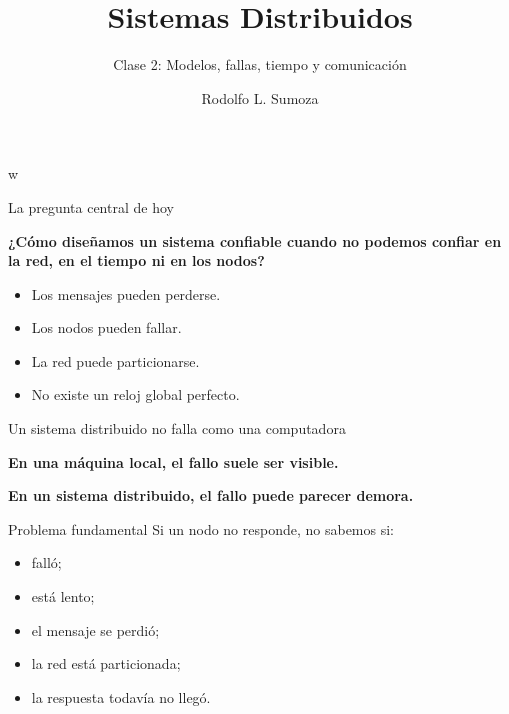 w\documentclass[aspectratio=169]{beamer}
\title{Sistemas Distribuidos}
\subtitle{Clase 2: Modelos, fallas, tiempo y comunicación}
\author{Rodolfo L. Sumoza}
\institute{Universidad Austral}
\date{}
\begin{document}
\begin{frame}
  \titlepage
\end{frame}

\begin{frame}{La pregunta central de hoy}

\Large

\begin{center}
\textbf{¿Cómo diseñamos un sistema confiable cuando no podemos confiar en la red, en el tiempo ni en los nodos?}
\end{center}

\vspace{1cm}

\normalsize

\begin{itemize}
    \item Los mensajes pueden perderse.
    \item Los nodos pueden fallar.
    \item La red puede particionarse.
    \item No existe un reloj global perfecto.
\end{itemize}

\end{frame}

\begin{frame}{Un sistema distribuido no falla como una computadora}

\Large

\begin{center}
\textbf{En una máquina local, el fallo suele ser visible.}
\end{center}

\vspace{0.5cm}

\begin{center}
\textbf{En un sistema distribuido, el fallo puede parecer demora.}
\end{center}

\vspace{0.8cm}

\normalsize

\begin{block}{Problema fundamental}
Si un nodo no responde, no sabemos si:
\end{block}

\begin{itemize}
    \item falló;
    \item está lento;
    \item el mensaje se perdió;
    \item la red está particionada;
    \item la respuesta todavía no llegó.
\end{itemize}

\end{frame}
\end{document}

